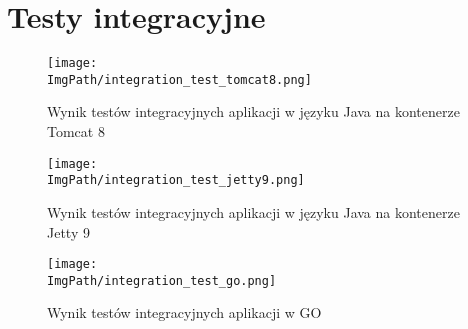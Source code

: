 \appendix
\chapter{Testy integracyjne}
\begin{figure}[!htb]
\centering
\hspace*{-3,5cm}
\texttt{[image: \\ImgPath/integration\_test\_tomcat8.png]}
\caption{Wynik testów integracyjnych aplikacji w języku Java na kontenerze Tomcat 8}
\end{figure}

\newpage
\begin{figure}[!ht]
\centering
\hspace*{-3cm}
\texttt{[image: \\ImgPath/integration\_test\_jetty9.png]}
\caption{Wynik testów integracyjnych aplikacji w języku Java na kontenerze Jetty 9}
\end{figure}

\newpage
\begin{figure}[!ht]
\centering
\hspace*{-3,5cm}
\texttt{[image: \\ImgPath/integration\_test\_go.png]}
\caption{Wynik testów integracyjnych aplikacji w GO}
\end{figure}